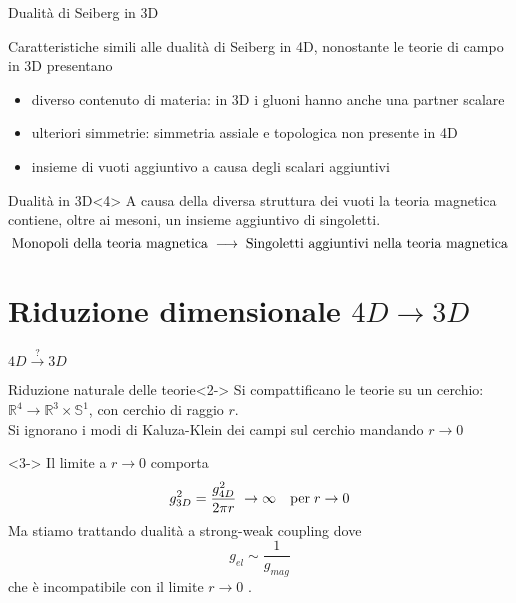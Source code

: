 \documentclass[10pt,compress]{beamer}
\begin{document}
\begin{frame}{Dualità di Seiberg in 3D}
\begin{block}{}
Caratteristiche simili alle dualità di Seiberg in 4D, nonostante le teorie di campo in 3D presentano
\begin{itemize}
\item<1-> diverso contenuto di materia: in 3D i gluoni hanno anche una partner scalare
\item <2-> ulteriori simmetrie: simmetria assiale e topologica non presente in 4D
\item <3-> insieme di vuoti aggiuntivo a causa degli scalari aggiuntivi 
\end{itemize}
\end{block}

\begin{block}{Dualità in 3D}<4>
A causa della diversa struttura dei vuoti la teoria magnetica contiene, oltre ai mesoni, un insieme aggiuntivo di singoletti.
$$
\hbox{Monopoli della teoria magnetica} \; \longrightarrow \; \hbox{Singoletti aggiuntivi nella teoria magnetica}
$$
\end{block}
\end{frame}

\section{Riduzione dimensionale $4D \rightarrow 3D$}
\begin{frame}{$4D\overset{?}{ \longrightarrow} 3D $}

\begin{block}{Riduzione naturale delle teorie}<2->
Si compattificano le teorie su un cerchio: $\mathbb{R}^4 \longrightarrow \mathbb{R}^3 \times \mathbb{S}^1$, con  cerchio di raggio $r$.\\
Si ignorano i modi di Kaluza-Klein dei campi sul cerchio mandando $r \rightarrow 0 $
\end{block}








\begin{block}{}<3->
Il limite a $r \rightarrow 0$ comporta
$$
 g^2_{3D} = \frac{g^2_{4D}}{2 \pi r} \; \rightarrow \infty \quad \hbox{per} \; r\rightarrow 0
$$
Ma stiamo trattando dualità a strong-weak coupling dove
$$
g_{el} \sim \frac{1}{g_{mag}}
$$ 
che è incompatibile con il limite $r \rightarrow 0 $ .
\end{block}

\end{frame}
\end{document}
